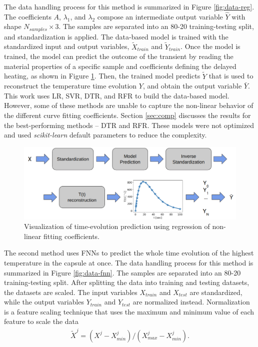 The data handling process for this method is summarized in Figure \ref{fig:data-reg}.
The coefficients $A$, $\lambda_1$, and $\lambda_2$ compose an intermediate output variable $\hat{Y}$ with shape $N_{samples} \times 3$.
The samples are separated into an 80-20 training-testing split, and standardization is applied.
The data-based model is trained with the standardized input and output variables, $\tilde{X}_{train}$ and $\tilde{Y}_{train}$.
Once the model is trained, the model can predict the outcome of the transient by reading the material properties of a specific sample and coefficients defining the delayed heating, as shown in Figure \ref{fig:data-reg1}.
Then, the trained model predicts $\tilde{Y}$ that is used to reconstruct the temperature time evolution $Y$, and obtain the output variable $\bar{Y}$.
This work uses \gls*{LR}, \gls*{SVR}, \gls*{DTR}, and \gls*{RFR} to build the data-based model.
However, some of these methods are unable to capture the non-linear behavior of the different curve fitting coefficients.
Section \ref{sec:comp} discusses the results for the best-performing methods -- \gls*{DTR} and \gls*{RFR}.
These models were not optimized and used \textit{scikit-learn} default parameters to reduce the complexity.

\begin{figure}[htbp!] %
  \centering
  \includegraphics[width=0.7\linewidth]{figures/data-prediction-tEvol-nlf}
  \caption{Visualization of time-evolution prediction using regression of non-linear fitting coefficients.}
  \label{fig:data-reg1}
\end{figure}

The second method uses FNNs to predict the whole time evolution of the highest temperature in the capsule at once.
The data handling process for this method is summarized in Figure \ref{fig:data-fnn}.
The samples are separated into an 80-20 training-testing split.
After splitting the data into training and testing datasets, the datasets are scaled.
The input variables $X_{train}$ and $X_{test}$ are standardized, while the output variables $Y_{train}$ and $Y_{test}$ are normalized instead.
Normalization is a feature scaling technique that uses the maximum and minimum value of each feature to scale the data
\begin{align}
\tilde{X}^j = (X^j - X_{min}^j) / (X_{max}^j - X_{min}^j).
\end{align}

